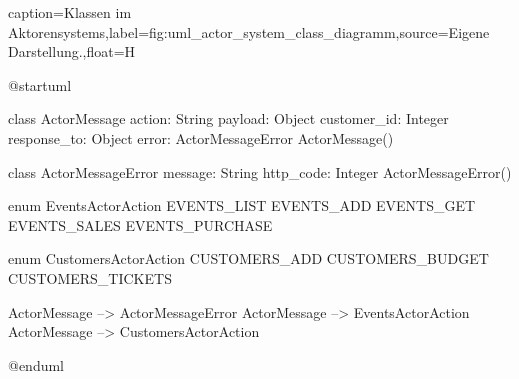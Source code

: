 \begin{dhbwfigure}{caption=Klassen im Aktorensystems,label=fig:uml_actor_system_class_diagramm,source={Eigene Darstellung.},float=H}
    \begin{plantuml}
        @startuml

        class ActorMessage {
            action: String
            payload: Object 
            customer_id: Integer
            response_to: Object
            error: ActorMessageError
            ActorMessage()
        }

        class ActorMessageError {
            message: String
            http_code: Integer 
            ActorMessageError()
        }

        enum EventsActorAction {
            EVENTS_LIST
            EVENTS_ADD
            EVENTS_GET
            EVENTS_SALES
            EVENTS_PURCHASE
        }

        enum CustomersActorAction {
            CUSTOMERS_ADD
            CUSTOMERS_BUDGET
            CUSTOMERS_TICKETS
        }

        ActorMessage --> ActorMessageError
        ActorMessage --> EventsActorAction
        ActorMessage --> CustomersActorAction

        @enduml
    \end{plantuml}
\end{dhbwfigure}\unskip
